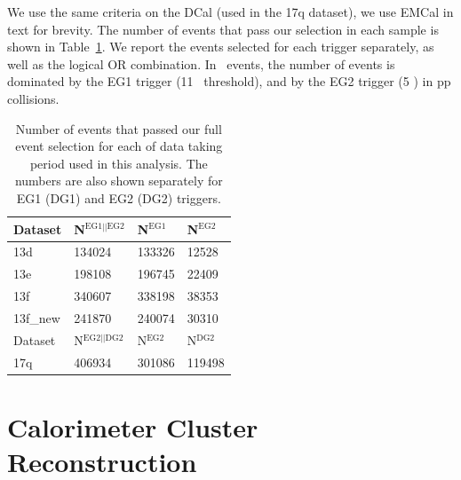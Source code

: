 We use the same criteria on the DCal (used in the 17q dataset), we use EMCal in text for brevity.
The number of events that pass our selection in each sample is shown in Table~\ref{tab:eventsselected}. We report the events selected for each trigger separately, as well as the logical OR combination. In \pPb~events, the number of events is dominated by the EG1 trigger (11 \GeVc~threshold), and by the EG2 trigger (5 \GeVc) in pp collisions. 

\begin{table}[h]
   \centering
   \caption{Number of events that passed our full event selection for each of data taking period used in this analysis. The numbers are also shown separately for EG1 (DG1) and EG2 (DG2) triggers.}
   \label{tab:eventsselected}
   \begin{tabular*}{1.0\columnwidth}{@{\extracolsep{\fill}}llll@{}}
    \hline
    Dataset &  	N$^{\mathrm{EG1||EG2}}$ &	N$^{\mathrm{EG1}}$ & N$^{\mathrm{EG2}}$\\
    \hline
    13d &	134024 & 133326 & 12528\\
    13e &	198108 & 196745 & 22409\\
    13f &   340607 & 338198 & 38353\\
    13f\_new & 241870 & 240074 & 30310\\
    \hline
    Dataset &	N$^{\mathrm{EG2 || DG2}}$ &		N$^{\mathrm{EG2}}$ & N$^{\mathrm{DG2}}$\\
    \hline

    17q & 406934 & 301086 & 119498 \\
 
    \hline
   \end{tabular*}
\end{table}

\section{Calorimeter Cluster Reconstruction}
\label{sec:clusterselection}
